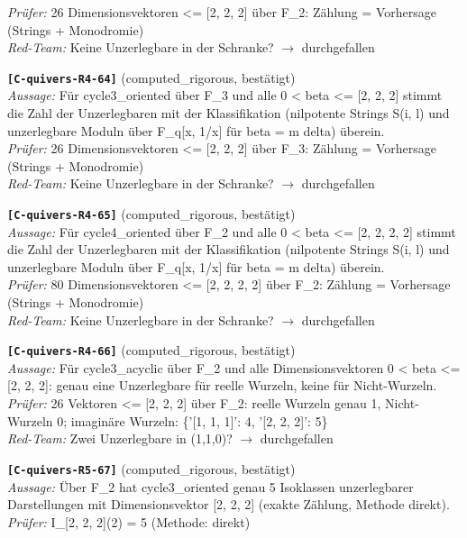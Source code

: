 \documentclass[11pt]{article}
\theoremstyle{definition}\newtheorem{definition}[theorem]{Definition}\newtheorem{remark}[theorem]{Remark}\newtheorem{observation}[theorem]{Numerical observation}
\begin{document}
\textit{Prüfer:} 26 Dimensionsvektoren <= [2, 2, 2] über F\_2: Zählung = Vorhersage (Strings + Monodromie)\\
\textit{Red-Team:} Keine Unzerlegbare in der Schranke? $\to$ durchgefallen\par\medskip
\noindent\textbf{\texttt{[C-quivers-R4-64]}} (computed\_rigorous, bestätigt)\\
\textit{Aussage:} Für cycle3\_oriented über F\_3 und alle 0 < beta <= [2, 2, 2] stimmt die Zahl der Unzerlegbaren mit der Klassifikation (nilpotente Strings S(i, l) und unzerlegbare Moduln über F\_q[x, 1/x] für beta = m delta) überein.\\
\textit{Prüfer:} 26 Dimensionsvektoren <= [2, 2, 2] über F\_3: Zählung = Vorhersage (Strings + Monodromie)\\
\textit{Red-Team:} Keine Unzerlegbare in der Schranke? $\to$ durchgefallen\par\medskip
\noindent\textbf{\texttt{[C-quivers-R4-65]}} (computed\_rigorous, bestätigt)\\
\textit{Aussage:} Für cycle4\_oriented über F\_2 und alle 0 < beta <= [2, 2, 2, 2] stimmt die Zahl der Unzerlegbaren mit der Klassifikation (nilpotente Strings S(i, l) und unzerlegbare Moduln über F\_q[x, 1/x] für beta = m delta) überein.\\
\textit{Prüfer:} 80 Dimensionsvektoren <= [2, 2, 2, 2] über F\_2: Zählung = Vorhersage (Strings + Monodromie)\\
\textit{Red-Team:} Keine Unzerlegbare in der Schranke? $\to$ durchgefallen\par\medskip
\noindent\textbf{\texttt{[C-quivers-R4-66]}} (computed\_rigorous, bestätigt)\\
\textit{Aussage:} Für cycle3\_acyclic über F\_2 und alle Dimensionsvektoren 0 < beta <= [2, 2, 2]: genau eine Unzerlegbare für reelle Wurzeln, keine für Nicht-Wurzeln.\\
\textit{Prüfer:} 26 Vektoren <= [2, 2, 2] über F\_2: reelle Wurzeln genau 1, Nicht-Wurzeln 0; imaginäre Wurzeln: \{'[1, 1, 1]': 4, '[2, 2, 2]': 5\}\\
\textit{Red-Team:} Zwei Unzerlegbare in (1,1,0)? $\to$ durchgefallen\par\medskip
\noindent\textbf{\texttt{[C-quivers-R5-67]}} (computed\_rigorous, bestätigt)\\
\textit{Aussage:} Über F\_2 hat cycle3\_oriented genau 5 Isoklassen unzerlegbarer Darstellungen mit Dimensionsvektor [2, 2, 2] (exakte Zählung, Methode direkt).\\
\textit{Prüfer:} I\_[2, 2, 2](2) = 5 (Methode: direkt)\\
\end{document}
